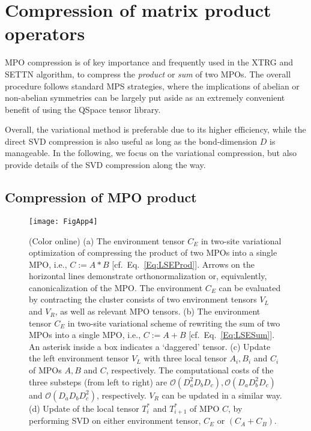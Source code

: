 \documentclass[aps,prx,twocolumn,showpacs,psfig,superscriptaddress,longbibliography]{revtex4-1}
\newcommand{\order}[1]{\mathcal{O}{\left(#1\right)}}
\newcommand{\Eq}[1]{Eq.~\eqref{#1}}
\begin{document}
\section{Compression of matrix product operators}
\label{App:VariComp}

MPO compression is of key importance and frequently used in the XTRG
and SETTN algorithm, to compress the \textit{product} or
\textit{sum} of two MPOs.  The overall procedure follows standard
MPS strategies, where the implications of abelian or non-abelian
symmetries can be largely put aside as an extremely convenient
benefit of using the QSpace tensor library.

Overall, the variational method is preferable due to its higher
efficiency, while the direct SVD compression is also useful as long
as the bond-dimension $D$ is manageable. In the following, we focus
on the variational compression, but also provide details of the SVD
compression along the way. 

\subsection{Compression of MPO product \label{sec:compress:prod}}
  
\begin{figure}[tbp]
\texttt{[image: FigApp4]}
\caption{(Color online) 
  (a) The environment tensor $C_E$ in two-site variational
  optimization of compressing the product of two MPOs into a single
  MPO, i.e., $C := A\ast B$ [cf.~\Eq{Eq:LSEProd}].  Arrows on the
  horizontal lines demonstrate orthonormalization or, equivalently,
  canonicalization of the MPO. The environment $C_E$ can be
  evaluated by contracting the cluster consists of two environment
  tensors $V_L$ and $V_R$, as well as relevant MPO tensors.
%
  (b) The environment tensor $C_E$ in two-site variational scheme of
  rewriting the sum of two MPOs into a single MPO, i.e., $C := A+B$
  [cf.~\Eq{Eq:LSESum}].  An asterisk inside a box indicates a
  `daggered' tensor.
%
  (c) Update the left environment tensor $V_L$ with three local
  tensor $A_i, B_i$ and $C_i$ of MPOs $A, B$ and $C$, respectively.
  The computational costs of the three substeps (from left to right)
  are $\order{D_a^2 D_b D_c}, \order{D_a D_b^2 D_c}$ and $\order{D_a
  D_b D_c^2}$, respectively. $V_R$ can be updated in a similar way.
%
  (d) Update of the local tensor $T^*_i$ and $T^*_{i+1}$ of MPO $C$,
  by performing SVD on either environment tensor, $C_{E}$ or $(C_{A}
  + C_{B})$.}
\label{Fig:VMPO}
\end{figure}
\end{document}
